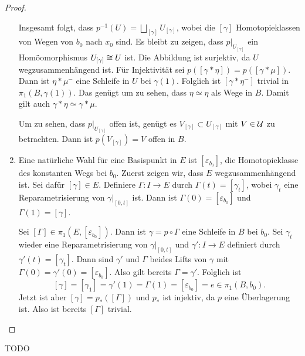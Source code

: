 \begin{proof}
\begin{enumerate}
Insgesamt folgt, dass $p^{-1}(U) = \bigsqcup_{[\gamma]} U_{[\gamma]}$, wobei die $[\gamma]$ Homotopieklassen von Wegen von $b_0$ nach $x_0$ sind. Es bleibt zu zeigen, dass $p|_{U_{[\gamma]}}$ ein Homöomorphismus $U_{[\gamma]} \isom U$ ist. Die Abbildung ist surjektiv, da $U$ wegzusammenhängend ist. Für Injektivität sei $p([\gamma*\eta]) = p([\gamma*\mu])$. Dann ist $\eta*\mu^{-}$ eine Schleife in $U$ bei $\gamma(1)$. Folglich ist $[\gamma*\eta^{-}]$ trivial in $\pi_1(B,\gamma(1))$. Das genügt um zu sehen, dass $\eta\simeq\eta$ als Wege in $B$. Damit gilt auch $\gamma*\eta\simeq\gamma*\mu$.

Um zu sehen, dass $p|_{U_{[\gamma]}}$ offen ist, genügt es $V_{[\gamma]}\subset U_{[\gamma]}$ mit $V\in\cal U$ zu betrachten. Dann ist $p(V_{[\gamma]}) = V$ offen in $B$.
\item Eine natürliche Wahl für eine Basispunkt in $E$ ist $[\varepsilon_{b_0}]$, die Homotopieklasse des konstanten Wegs bei $b_0$. Zuerst zeigen wir, dass $E$ wegzusammenhängend ist. Sei dafür $[\gamma]\in E$. Definiere $\Gamma\colon I\to E$ durch $\Gamma(t) = [\gamma_t]$, wobei $\gamma_t$ eine Reparametrisierung von $\gamma|_{[0,t]}$ ist. Dann ist $\Gamma(0) = [\varepsilon_{b_0}]$ und $\Gamma(1) = [\gamma]$.

Sei $[\Gamma]\in\pi_1(E,[\varepsilon_{b_0}])$. Dann ist $\gamma = p\circ\Gamma$ eine Schleife in $B$ bei $b_0$. Sei $\gamma_t$ wieder eine Reparametrisierung von $\gamma|_{[0,t]}$ und $\gamma'\colon I\to E$ definiert durch $\gamma'(t) = [\gamma_t]$. Dann sind $\gamma'$ und $\Gamma$ beides Lifts von $\gamma$ mit $\Gamma(0) = \gamma'(0) = [\varepsilon_{b_0}]$. Also gilt bereits $\Gamma = \gamma'$. Folglich ist
\[
[\gamma] = [\gamma_1] = \gamma'(1) = \Gamma(1) = [\varepsilon_{b_0}] = e \in\pi_1(B,b_0).
\]
Jetzt ist aber $[\gamma] = p_*([\Gamma])$ und $p_*$ ist injektiv, da $p$ eine Überlagerung ist. Also ist bereits $[\Gamma]$ trivial.\qedhere
\end{enumerate}
\end{proof}

TODO

